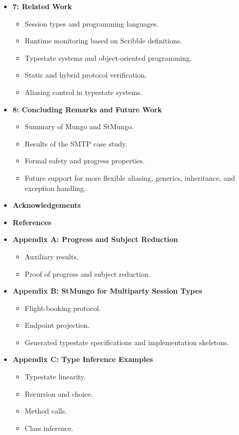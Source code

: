 \begin{itemize}
    \item \textbf{7: Related Work}
    \begin{itemize}
        \item Session types and programming languages.
        \item Runtime monitoring based on Scribble definitions.
        \item Typestate systems and object-oriented programming.
        \item Static and hybrid protocol verification.
        \item Aliasing control in typestate systems.
    \end{itemize}

    \item \textbf{8: Concluding Remarks and Future Work}
    \begin{itemize}
        \item Summary of Mungo and StMungo.
        \item Results of the SMTP case study.
        \item Formal safety and progress properties.
        \item Future support for more flexible aliasing, generics,
        inheritance, and exception handling.
    \end{itemize}

    \item \textbf{Acknowledgements}

    \item \textbf{References}

    \item \textbf{Appendix A: Progress and Subject Reduction}
    \begin{itemize}
        \item Auxiliary results.
        \item Proof of progress and subject reduction.
    \end{itemize}

    \item \textbf{Appendix B: StMungo for Multiparty Session Types}
    \begin{itemize}
        \item Flight-booking protocol.
        \item Endpoint projection.
        \item Generated typestate specifications and implementation skeletons.
    \end{itemize}

    \item \textbf{Appendix C: Type Inference Examples}
    \begin{itemize}
        \item Typestate linearity.
        \item Recursion and choice.
        \item Method calls.
        \item Class inference.
    \end{itemize}
\end{itemize}

